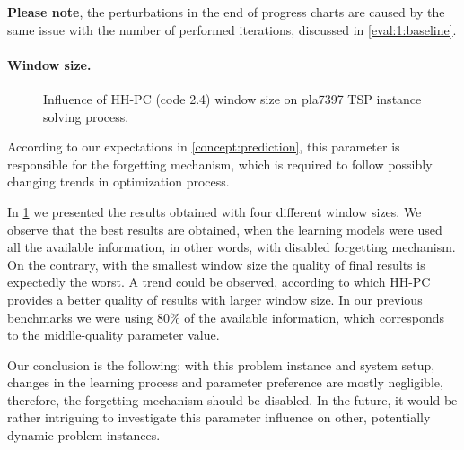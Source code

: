 \textbf{Please note}, the perturbations in the end of progress charts are caused by the same issue with the number of performed iterations, discussed in \cref{eval:1:baseline}.

\paragraph{Window size.}
\begin{figure}[h]
	\centering
	\vspace{-20pt}
	
	\caption{Influence of HH-PC (code 2.4) window size on pla7397 TSP instance solving process.}
	\vspace{-5pt}
	\label{eval:2:pict:window size}
\end{figure}
According to our expectations in \cref{concept:prediction}, this parameter is responsible for the forgetting mechanism, which is required to follow possibly changing trends in optimization process.

In \cref{eval:2:pict:window size} we presented the results obtained with four different window sizes. We observe that the best results are obtained, when the learning models were used all the available information, in other words, with disabled forgetting mechanism. On the contrary, with the smallest window size the quality of final results is expectedly the worst. A trend could be observed, according to which HH-PC provides a better quality of results with larger window size. In our previous benchmarks we were using 80\% of the available information, which corresponds to the middle-quality parameter value.

Our conclusion is the following: with this problem instance and system setup, changes in the learning process and parameter preference are mostly negligible, therefore, the forgetting mechanism should be disabled. In the future, it would be rather intriguing to investigate this parameter influence on other, potentially dynamic problem instances.

